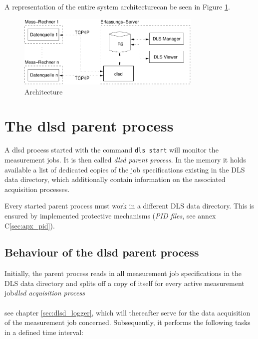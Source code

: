 \documentclass[a4paper,12pt,BCOR6mm,bibtotoc,idxtotoc]{scrbook}
\begin{document}
A representation of the entire system architecturecan be seen in Figure \ref{fig:arch}.

\begin{figure}[htb] \begin{center} \includegraphics[width=250pt]{bilder/arch} \end{center} \caption{Architecture} \label{fig:arch} \end{figure}


\section{The dlsd parent process} \label{sec:dlsd_mother} 

A dlsd process started with the command \texttt{dls start} will monitor the measurement jobs. It is then called \textit{dlsd parent process}. In the memory it holds available a list of dedicated copies of the job specifications existing in the DLS data directory, which additionally contain information on the associated acquisition processes.

Every started parent process must work in a different DLS data directory. This is ensured by implemented protective mechanisms (\textit{PID files}, see annex C\ref{sec:apx_pid}).


\subsection{Behaviour of the dlsd parent process} \label{sec:dlsd_mother_behaviour}

Initially, the parent process reads in all measurement job specifications in the DLS data directory and splits off a copy of itself for every active measurement job\textit{dlsd acquisition process\\\\}see chapter \ref{sec:dlsd_logger}, which will thereafter serve for the data acquisition of the measurement job concerned. Subsequently, it performs the following tasks in a defined time interval:
\end{document}

